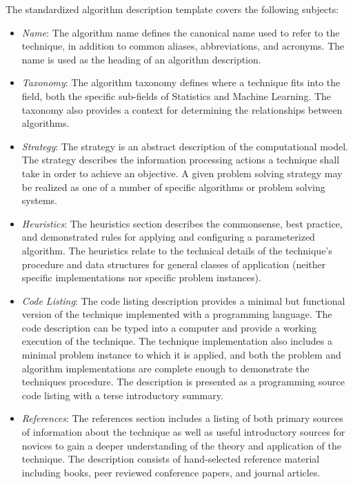 The standardized algorithm description template covers the following subjects:
\begin{itemize}
	\item \emph{Name}: The algorithm name defines the canonical name used to refer to the technique, in addition to common aliases, abbreviations, and acronyms. The name is used as the heading of an algorithm description.
	\item \emph{Taxonomy}: The algorithm taxonomy defines where a technique fits into the field, both the specific sub-fields of Statistics and Machine Learning. The taxonomy also provides a context for determining the relationships between algorithms.
	\item \emph{Strategy}: The strategy is an abstract description of the computational model. The strategy describes the information processing actions a technique shall take in order to achieve an objective. A given problem solving strategy may be realized as one of a number of specific algorithms or problem solving systems.
	\item \emph{Heuristics}: The heuristics section describes the commonsense, best practice, and demonstrated rules for applying and configuring a parameterized algorithm. The heuristics relate to the technical details of the technique's procedure and data structures for general classes of application (neither specific implementations nor specific problem instances).
	\item \emph{Code Listing}: The code listing description provides a minimal but functional version of the technique implemented with a programming language. The code description can be typed into a computer and provide a working execution of the technique. The technique implementation also includes a minimal problem instance to which it is applied, and both the problem and algorithm implementations are complete enough to demonstrate the techniques procedure. The description is presented as a programming source code listing with a terse introductory summary.
	\item \emph{References}: The references section includes a listing of both primary sources of information about the technique as well as useful introductory sources for novices to gain a deeper understanding of the theory and application of the technique. The description consists of hand-selected reference material including books, peer reviewed conference papers, and journal articles.
\end{itemize}


